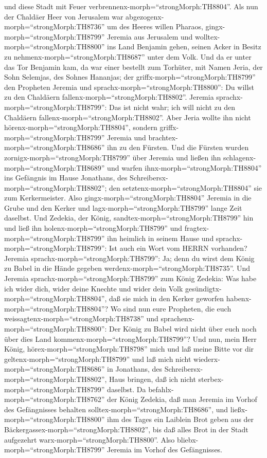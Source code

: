 und diese Stadt mit Feuer verbrennenx-morph=``strongMorph:TH8804''.
 Als nun der Chaldäer Heer von Jerusalem war
abgezogenx-morph=``strongMorph:TH8736'' um des Heeres willen Pharaos,
 gingx-morph=``strongMorph:TH8799'' Jeremia aus Jerusalem
und wolltex-morph=``strongMorph:TH8800'' ins Land Benjamin gehen, seinen
Acker in Besitz zu nehmenx-morph=``strongMorph:TH8687'' unter dem Volk.
 Und da er unter das Tor Benjamin kam, da war einer
bestellt zum Torhüter, mit Namen Jeria, der Sohn Selemjas, des Sohnes
Hananjas; der griffx-morph=``strongMorph:TH8799'' den Propheten Jeremia
und sprachx-morph=``strongMorph:TH8800'': Du willst zu den Chaldäern
fallenx-morph=``strongMorph:TH8802''.  Jeremia
sprachx-morph=``strongMorph:TH8799'': Das ist nicht wahr; ich will nicht
zu den Chaldäern fallenx-morph=``strongMorph:TH8802''. Aber Jeria wollte
ihn nicht hörenx-morph=``strongMorph:TH8804'', sondern
griffx-morph=``strongMorph:TH8799'' Jeremia und
brachtex-morph=``strongMorph:TH8686'' ihn zu den Fürsten. 
Und die Fürsten wurden zornigx-morph=``strongMorph:TH8799'' über Jeremia
und ließen ihn schlagenx-morph=``strongMorph:TH8689'' und warfen
ihnx-morph=``strongMorph:TH8804'' ins Gefängnis im Hause Jonathans, des
Schreibersx-morph=``strongMorph:TH8802''; den
setztenx-morph=``strongMorph:TH8804'' sie zum Kerkermeister.
 Also gingx-morph=``strongMorph:TH8804'' Jeremia in die
Grube und den Kerker und lagx-morph=``strongMorph:TH8799'' lange Zeit
daselbst.  Und Zedekia, der König,
sandtex-morph=``strongMorph:TH8799'' hin und ließ ihn
holenx-morph=``strongMorph:TH8799'' und
fragtex-morph=``strongMorph:TH8799'' ihn heimlich in seinem Hause und
sprachx-morph=``strongMorph:TH8799'': Ist auch ein Wort vom HERRN
vorhanden? Jeremia sprachx-morph=``strongMorph:TH8799'': Ja; denn du
wirst dem König zu Babel in die Hände gegeben
werdenx-morph=``strongMorph:TH8735''.  Und Jeremia
sprachx-morph=``strongMorph:TH8799'' zum König Zedekia: Was habe ich
wider dich, wider deine Knechte und wider dein Volk
gesündigtx-morph=``strongMorph:TH8804'', daß sie mich in den Kerker
geworfen habenx-morph=``strongMorph:TH8804''?  Wo sind nun
eure Propheten, die euch weissagtenx-morph=``strongMorph:TH8738'' und
sprachenx-morph=``strongMorph:TH8800'': Der König zu Babel wird nicht
über euch noch über dies Land kommenx-morph=``strongMorph:TH8799''?
 Und nun, mein Herr König,
hörex-morph=``strongMorph:TH8798'' mich und laß meine Bitte vor dir
geltenx-morph=``strongMorph:TH8799'' und laß mich nicht
wiederx-morph=``strongMorph:TH8686'' in Jonathans, des
Schreibersx-morph=``strongMorph:TH8802'', Haus bringen, daß ich nicht
sterbex-morph=``strongMorph:TH8799'' daselbst.  Da
befahlx-morph=``strongMorph:TH8762'' der König Zedekia, daß man Jeremia
im Vorhof des Gefängnisses behalten
solltex-morph=``strongMorph:TH8686'', und
ließx-morph=``strongMorph:TH8800'' ihm des Tages ein Laiblein Brot geben
aus der Bäckergassex-morph=``strongMorph:TH8802'', bis daß alles Brot in
der Stadt aufgezehrt warx-morph=``strongMorph:TH8800''. Also
bliebx-morph=``strongMorph:TH8799'' Jeremia im Vorhof des Gefängnisses.

